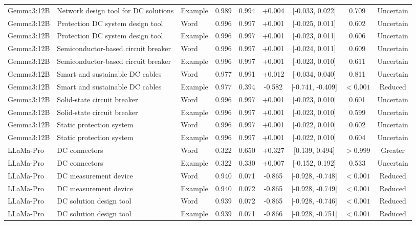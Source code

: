 \begin{landscape}
\begin{longtable}{lllcccccc}
Gemma3:12B & Network design tool for DC solutions & Example & 0.989 & 0.994 & +0.004 & [-0.033, 0.022] & 0.709 & Uncertain \\
Gemma3:12B & Protection DC system design tool & Word & 0.996 & 0.997 & +0.001 & [-0.025, 0.011] & 0.602 & Uncertain \\
Gemma3:12B & Protection DC system design tool & Example & 0.996 & 0.997 & +0.001 & [-0.023, 0.011] & 0.606 & Uncertain \\
Gemma3:12B & Semiconductor-based circuit breaker & Word & 0.996 & 0.997 & +0.001 & [-0.024, 0.011] & 0.609 & Uncertain \\
Gemma3:12B & Semiconductor-based circuit breaker & Example & 0.996 & 0.997 & +0.001 & [-0.023, 0.010] & 0.611 & Uncertain \\
Gemma3:12B & Smart and sustainable DC cables & Word & 0.977 & 0.991 & +0.012 & [-0.034, 0.040] & 0.811 & Uncertain \\
Gemma3:12B & Smart and sustainable DC cables & Example & 0.977 & 0.394 & -0.582 & [-0.741, -0.409] & $<0.001$ & Reduced \\
Gemma3:12B & Solid-state circuit breaker & Word & 0.996 & 0.997 & +0.001 & [-0.023, 0.010] & 0.601 & Uncertain \\
Gemma3:12B & Solid-state circuit breaker & Example & 0.996 & 0.997 & +0.001 & [-0.023, 0.010] & 0.599 & Uncertain \\
Gemma3:12B & Static protection system & Word & 0.996 & 0.997 & +0.001 & [-0.022, 0.010] & 0.602 & Uncertain \\
Gemma3:12B & Static protection system & Example & 0.996 & 0.997 & +0.001 & [-0.022, 0.010] & 0.604 & Uncertain \\
LLaMa-Pro & DC connectors & Word & 0.322 & 0.650 & +0.327 & [0.139, 0.494] & $>0.999$ & Greater \\
LLaMa-Pro & DC connectors & Example & 0.322 & 0.330 & +0.007 & [-0.152, 0.192] & 0.533 & Uncertain \\
LLaMa-Pro & DC measurement device & Word & 0.940 & 0.071 & -0.865 & [-0.928, -0.748] & $<0.001$ & Reduced \\
LLaMa-Pro & DC measurement device & Example & 0.940 & 0.072 & -0.865 & [-0.928, -0.749] & $<0.001$ & Reduced \\
LLaMa-Pro & DC solution design tool & Word & 0.939 & 0.072 & -0.865 & [-0.928, -0.746] & $<0.001$ & Reduced \\
LLaMa-Pro & DC solution design tool & Example & 0.939 & 0.071 & -0.866 & [-0.928, -0.751] & $<0.001$ & Reduced \\

\end{longtable}
\end{landscape}
